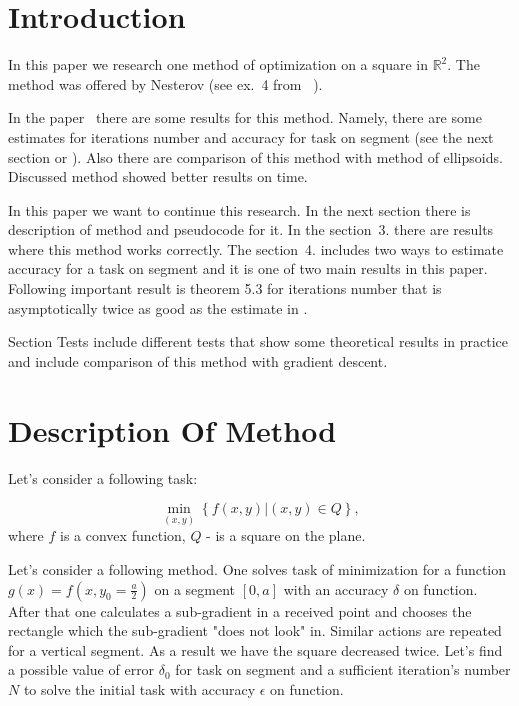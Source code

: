 \documentclass[12pt]{article}
\begin{document}
\tableofcontents
\newpage

\section{Introduction}

In this paper we research one method of optimization on a square in $\mathbb{R}^2$. The method was offered by Nesterov (see ex.~4 from ~\cite{task}). 

In the paper~\cite{Ston_Pas} there are some results for this method. Namely, there are some estimates for iterations number and accuracy for task on segment (see the next section or \cite{Ston_Pas}). Also there are comparison of this method with method of ellipsoids. Discussed method showed better results on time.

In this paper we want to continue this research. In the next section there is description of method and pseudocode for it. In the section~3. there are results where this method works correctly. The section~4. includes two ways to estimate accuracy for a task on segment and it is one of two main results in this paper. Following important result is theorem 5.3 for iterations number that is asymptotically twice as good as the estimate in \cite{Ston_Pas}.

Section Tests include different tests that show some theoretical results in practice and include comparison of this method with gradient descent. 

\section{Description Of Method}

Let's consider a following task:

$$\min_{(x,y)}\left\{f(x,y)|(x,y) \in Q\right\},$$
where $f$ is a convex function, $Q$ - is a square on the plane.

Let's consider a following method. One solves task of minimization for a function $g(x) = f\left(x, y_0 = \frac{a}{2}\right)$ on a segment $[0, a]$ with an accuracy $\delta$ on function. After that one calculates a sub-gradient in a received point and chooses the rectangle which the sub-gradient "does not look" in. Similar actions are repeated for a vertical segment. As a result we have the square decreased twice. Let's find a possible value of error $\delta_0$ for task on segment and a sufficient iteration's number $N$ to solve the initial task with accuracy $\epsilon$ on function.
\end{document}
